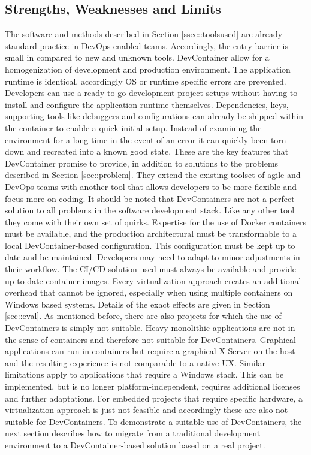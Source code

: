     \subsection{Strengths, Weaknesses and Limits}\label{ssec::limits}
    The software and methods described in Section \ref{ssec::toolsused} are already standard practice in DevOps enabled teams. Accordingly, the entry barrier is small in compared to new and unknown tools. DevContainer allow for a homogenization of development and production environment. The application runtime is identical, accordingly \ac{OS} or runtime specific errors are prevented. Developers can use a ready to go development project setups without having to install and configure the application runtime themselves. Dependencies, keys, supporting tools like debuggers and configurations can already be shipped within the container to enable a quick initial setup. Instead of examining the environment for a long time in the event of an error it can quickly been torn down and recreated into a known good state. These are the key features that DevContainer promise to provide, in addition to solutions to the problems described in Section \ref{sec::problem}. They extend the existing toolset of agile and DevOps teams with another tool that allows developers to be more flexible and focus more on coding.\newline
    It should be noted that DevContainers are not a perfect solution to all problems in the software development stack. Like any other tool they come with their own set of quirks. Expertise for the use of Docker containers must be available, and the production architectural must be transformable to a local DevContainer-based configuration. This configuration must be kept up to date and be maintained. Developers may need to adapt to minor adjustments in their workflow. The \ac{CI}/\ac{CD} solution used must always be available and provide up-to-date container images. Every virtualization approach creates an additional overhead that cannot be ignored, especially when using multiple containers on Windows based systems. Details of the exact effects are given in Section \ref{sec::eval}.\newline
    As mentioned before, there are also projects for which the use of DevContainers is simply not suitable. Heavy monolithic applications are not in the sense of containers and therefore not suitable for DevContainers. Graphical applications can run in containers but require a graphical X-Server on the host and the resulting experience is not comparable to a native \ac{UX}. Similar limitations apply to applications that require a Windows stack. This can be implemented, but is no longer platform-independent, requires additional licenses and further adaptations. For embedded projects that require specific hardware, a virtualization approach is just not feasible and accordingly these are also not suitable for DevContainers.\newline
    To demonstrate a suitable use of DevContainers, the next section describes how to migrate from a traditional development environment to a DevContainer-based solution based on a real project.

